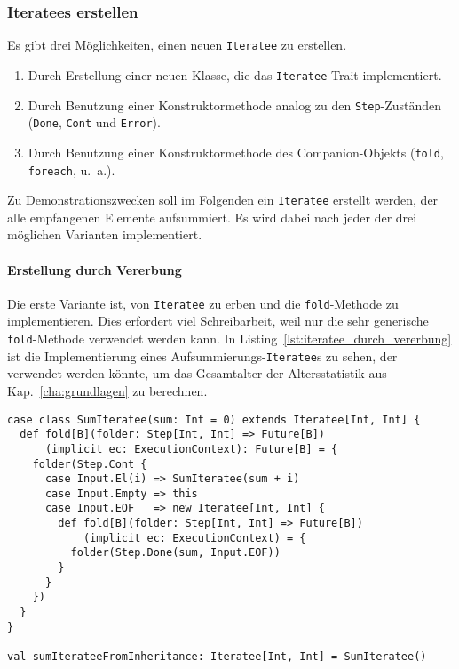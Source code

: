 \subsubsection{Iteratees erstellen} %
\label{ssub:iteratees_erstellen}

Es gibt drei Möglichkeiten, einen neuen \lstinline|Iteratee| zu erstellen.
\begin{enumerate}
  \item Durch Erstellung einer neuen Klasse, die das \lstinline|Iteratee|-Trait implementiert.
  \item Durch Benutzung einer Konstruktormethode analog zu den \lstinline|Step|-Zuständen (\lstinline|Done|, \lstinline|Cont| und \lstinline|Error|).
  \item Durch Benutzung einer Konstruktormethode des Companion-Objekts (\lstinline|fold|, \lstinline|foreach|, u.~a.).
\end{enumerate}

Zu Demonstrationszwecken soll im Folgenden ein \lstinline|Iteratee| erstellt werden, der alle empfangenen Elemente aufsummiert.
Es wird dabei nach jeder der drei möglichen Varianten implementiert.

\paragraph{Erstellung durch Vererbung} %
\label{par:erstellung_durch_vererbung}\mbox{} %

Die erste Variante ist, von \lstinline|Iteratee| zu erben und die \lstinline|fold|-Methode zu implementieren.
Dies erfordert viel Schreibarbeit, weil nur die sehr generische \lstinline|fold|-Methode verwendet werden kann.
In Listing~\ref{lst:iteratee_durch_vererbung} ist die Implementierung eines Aufsummierungs-\lstinline|Iteratee|s zu sehen, der verwendet werden könnte, um das Gesamtalter der Altersstatistik aus Kap.~\ref{cha:grundlagen} zu berechnen.

\begin{lstlisting}[caption=Erstellung eines Iteratees durch Vererbung, label=lst:iteratee_durch_vererbung]
case class SumIteratee(sum: Int = 0) extends Iteratee[Int, Int] {
  def fold[B](folder: Step[Int, Int] => Future[B])
      (implicit ec: ExecutionContext): Future[B] = {
    folder(Step.Cont {
      case Input.El(i) => SumIteratee(sum + i)
      case Input.Empty => this
      case Input.EOF   => new Iteratee[Int, Int] {
        def fold[B](folder: Step[Int, Int] => Future[B])
            (implicit ec: ExecutionContext) = {
          folder(Step.Done(sum, Input.EOF))
        }
      }
    })
  }
}

val sumIterateeFromInheritance: Iteratee[Int, Int] = SumIteratee()
\end{lstlisting}


